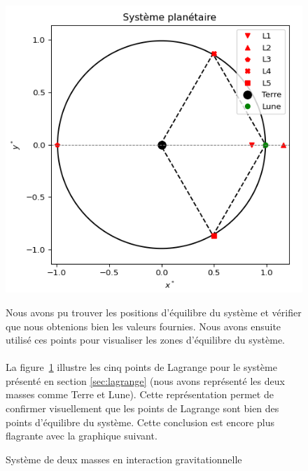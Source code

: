 \documentclass{article}
\begin{document}
\begin{figure}[H]
  \centering
  \begin{minipage}{0.45\textwidth}
  \includegraphics[width=\textwidth]{syteme_planaire.png}
  \caption{Système de deux masses en interaction gravitationnelle}
  \label{fig:lagrange-points}
  \end{minipage}%
  \hfill
  \begin{minipage}{0.5\textwidth}
  Nous avons pu trouver les positions d'équilibre du système et vérifier que nous obtenions bien les valeurs fournies. Nous avons ensuite utilisé ces points pour visualiser les zones d'équilibre du système.\\ \phantom{text} \\
  La figure~\ref{fig:lagrange-points} illustre les cinq points de Lagrange pour le système présenté en section \ref{sec:lagrange} (nous avons représenté les deux masses comme Terre et Lune). Cette représentation permet de confirmer visuellement que les points de Lagrange sont bien des points d'équilibre du système. Cette conclusion est encore plus flagrante avec la graphique suivant.
  \end{minipage}
\end{figure}
\end{document}
